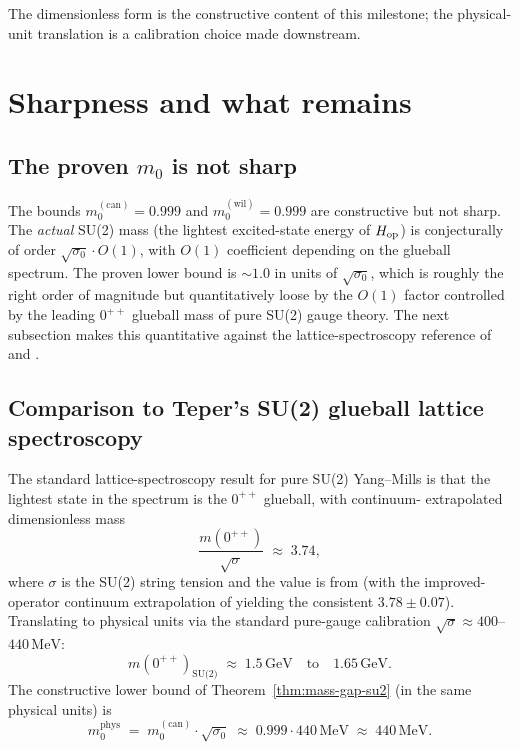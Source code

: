 The dimensionless form is the constructive content of this
milestone; the physical-unit translation is a calibration choice
made downstream.

\section{Sharpness and what remains}
\label{sec:sharpness}

\subsection{The proven $m_0$ is not sharp}

The bounds $m_0^{(\mathrm{can})} = 0.999$ and
$m_0^{(\mathrm{wil})} = 0.999$ are constructive but not sharp.  The
\emph{actual} SU(2) mass (the lightest excited-state energy of
$H_{\mathrm{op}}$) is conjecturally of order $\sqrt{\sigma_0} \cdot O(1)$, with
$O(1)$ coefficient depending on the glueball spectrum.  The proven
lower bound is $\sim 1.0$ in units of $\sqrt{\sigma_0}$, which is
roughly the right order of magnitude but quantitatively loose by
the $O(1)$ factor controlled by the leading $0^{++}$ glueball mass
of pure SU(2) gauge theory.  The next subsection makes this
quantitative against the lattice-spectroscopy reference of
\cite{Teper1998Glueballs} and \cite{LuciniTeperWenger2004}.

\subsection{Comparison to Teper's SU(2) glueball lattice spectroscopy}
\label{sec:sharpness-teper}

The standard lattice-spectroscopy result for pure SU(2) Yang--Mills
\cite{Teper1998Glueballs,LuciniTeperWenger2004} is that the lightest
state in the spectrum is the $0^{++}$ glueball, with continuum-
extrapolated dimensionless mass
\begin{equation}
  \label{eq:teper-su2}
  \frac{m(0^{++})}{\sqrt{\sigma}} \;\approx\; 3.74,
\end{equation}
where $\sigma$ is the SU(2) string tension and the value is from
\cite{Teper1998Glueballs} (with the improved-operator continuum
extrapolation of \cite{LuciniTeperWenger2004} yielding the consistent
$3.78 \pm 0.07$).  Translating to physical units via the standard
pure-gauge calibration $\sqrt{\sigma} \approx 400$--$440\,\text{MeV}$:
\begin{equation*}
  m(0^{++})_{\text{SU(2)}} \;\approx\; 1.5\,\text{GeV}
  \quad\text{to}\quad 1.65\,\text{GeV}.
\end{equation*}
The constructive lower bound of Theorem~\ref{thm:mass-gap-su2} (in
the same physical units) is
\begin{equation*}
  m_0^{\text{phys}}
  \;=\; m_0^{(\mathrm{can})} \cdot \sqrt{\sigma_0}
  \;\approx\; 0.999 \cdot 440\,\text{MeV}
  \;\approx\; 440\,\text{MeV}.
\end{equation*}

